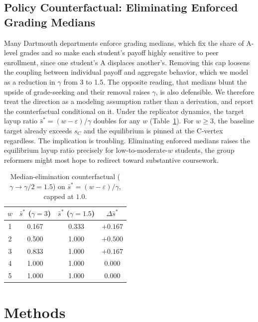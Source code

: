 \documentclass[12pt]{article}
\begin{document}
\subsection{Policy Counterfactual: Eliminating Enforced Grading Medians}

Many Dartmouth departments enforce grading medians, which fix the
share of A-level grades and so make each student's payoff highly
sensitive to peer enrollment, since one student's A displaces
another's. Removing this cap loosens the coupling between individual
payoff and aggregate behavior, which we model as a reduction in
$\gamma$ from 3 to 1.5. The opposite reading, that medians blunt the
upside of grade-seeking and their removal raises $\gamma$, is also
defensible. We therefore treat the direction as a modeling assumption
rather than a derivation, and report the counterfactual conditional on
it.
Under the replicator dynamics, the target layup ratio
$\bar s^\ast = (w - \varepsilon)/\gamma$ doubles for any $w$
(Table~\ref{tab:policy}). For $w \geq 3$, the baseline target already
exceeds $s_C$ and the equilibrium is pinned at the C-vertex regardless.
The implication is troubling. Eliminating enforced medians raises the
equilibrium layup ratio precisely for low-to-moderate-$w$ students,
the group reformers might most hope to redirect toward substantive
coursework.

\begin{table}[H]
\centering
\caption{Median-elimination counterfactual ($\gamma \to \gamma/2 = 1.5$)
on $\bar s^\ast = (w - \varepsilon)/\gamma$, capped at $1.0$.}
\label{tab:policy}
\small
\begin{tabular}{cccc}
\toprule
$w$ & $\bar{s}^*$ ($\gamma = 3$) & $\bar{s}^*$ ($\gamma = 1.5$) & $\Delta \bar{s}^*$ \\
\midrule
1 & 0.167 & 0.333 & $+0.167$ \\
2 & 0.500 & 1.000 & $+0.500$ \\
3 & 0.833 & 1.000 & $+0.167$ \\
4 & 1.000 & 1.000 & 0.000 \\
5 & 1.000 & 1.000 & 0.000 \\
\bottomrule
\end{tabular}
\end{table}

\section{Methods}
\end{document}
